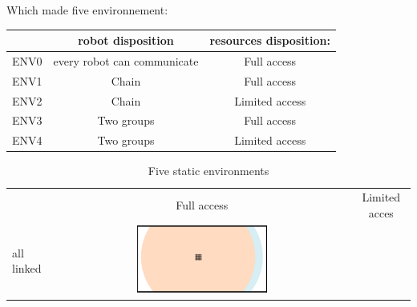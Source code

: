 \documentclass[a4paper,10pt]{article}
\begin{document}
Which made five environnement:
\begin{table}[h]
\begin{tabular}{l|c|c|}
&robot disposition& resources disposition: \\
\hline
ENV0 &every robot can communicate& Full access\\\hline
ENV1 &Chain & Full access\\\hline
ENV2 &Chain & Limited access \\\hline
ENV3&Two groups & Full access\\\hline
ENV4&Two groups & Limited access 
\end{tabular}

\end{table}
\newcommand{\imgSize}{0.45\textwidth}
\begin{table}[h]
\caption{Five static environments}
\centering
\begin{tabular}{lcc}
&Full access&Limited acces\\
all linked&\includegraphics[width=\imgSize]{../images/5StaticEnv/environments/staticEnv0}&\\

\end{tabular}
\end{table}
\end{document}
